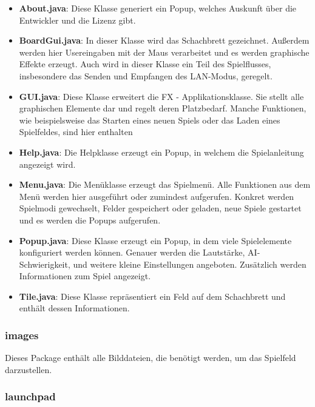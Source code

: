 \documentclass[12pt,a4paper]{article}
\begin{document}
\begin{itemize}

	\item{\textbf{About.java}: Diese Klasse generiert ein Popup, welches Auskunft über die Entwickler und die Lizenz gibt. }
	
	\item{\textbf{BoardGui.java}: In dieser Klasse wird das Schachbrett gezeichnet. Außerdem werden hier Usereingaben mit der Maus verarbeitet und es werden graphische Effekte erzeugt. Auch wird in dieser Klasse ein Teil des Spielflusses, insbesondere das Senden und Empfangen des LAN-Modus, geregelt. }
	
	\item{\textbf{GUI.java}: Diese Klasse erweitert die FX - Applikationsklasse. Sie stellt alle graphischen Elemente dar und regelt deren Platzbedarf. Manche Funktionen, wie beispielsweise das Starten eines neuen Spiels oder das Laden eines Spielfeldes, sind hier enthalten }
	
	\item{\textbf{Help.java}: Die Helpklasse erzeugt ein Popup, in welchem die Spielanleitung angezeigt wird.}
	
	\item{\textbf{Menu.java}: Die Menüklasse erzeugt das Spielmenü. Alle Funktionen aus dem Menü werden hier ausgeführt oder zumindest aufgerufen. Konkret werden Spielmodi gewechselt, Felder gespeichert oder geladen, neue Spiele gestartet und es werden die Popups aufgerufen.}
	
	\item{\textbf{Popup.java}: Diese Klasse erzeugt ein Popup, in dem viele Spielelemente konfiguriert werden können. Genauer werden die Lautstärke, AI-Schwierigkeit, und weitere kleine Einstellungen angeboten. Zusätzlich werden Informationen zum Spiel angezeigt. }
	
	\item{\textbf{Tile.java}: Diese Klasse repräsentiert ein Feld auf dem Schachbrett und enthält dessen Informationen.}

\end{itemize}

\subsubsection{images}

Dieses Package enthält alle Bilddateien, die benötigt werden, um das Spielfeld darzustellen. 

\subsubsection{launchpad}
\end{document}
